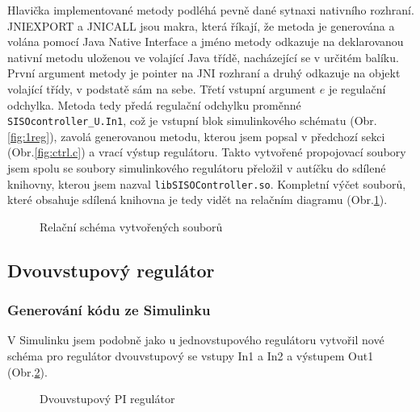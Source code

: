 \documentclass[thesis=M,czech,hidelinks]{FITthesis}[2012/06/26]
\begin{document}
Hlavička implementované metody podléhá pevně dané sytnaxi nativního rozhraní. JNIEXPORT a JNICALL jsou makra, která říkají, že metoda je generována a volána pomocí Java Native Interface a jméno metody odkazuje na deklarovanou nativní metodu uloženou ve volající Java třídě, nacházející se v určitém balíku. První argument metody je pointer na JNI rozhraní a druhý odkazuje na objekt volající třídy, v podstatě sám na sebe.\cite{jnitut} Třetí vstupní argument $e$ je regulační odchylka. Metoda tedy předá regulační odchylku proměnné \texttt{SISOcontroller\_U.In1}, což je vstupní blok simulinkového schématu (Obr.\ref{fig:1reg}), zavolá generovanou metodu, kterou jsem popsal v předchozí sekci (Obr.\ref{fig:ctrl.c}) a vrací
výstup regulátoru. Takto vytvořené propojovací soubory jsem spolu se soubory simulinkového regulátoru přeložil v autíčku do sdílené knihovny, kterou jsem nazval \texttt{libSISOController.so}. Kompletní výčet souborů, které obsahuje sdílená knihovna je tedy vidět na relačním diagramu (Obr.\ref{fig:siso}).
\begin{figure}[h]
        \centering
        \caption{Relační schéma vytvořených souborů}
        \label{fig:siso}
\end{figure} 

\subsection{Dvouvstupový regulátor}
\subsubsection*{Generování kódu ze Simulinku}
V Simulinku jsem podobně jako u jednovstupového regulátoru vytvořil nové schéma pro regulátor dvouvstupový  se vstupy In1 a In2 a výstupem Out1 (Obr.\ref{fig:2reg}). 
\begin{figure}[h]
        \centering
        \caption{Dvouvstupový PI regulátor}
        \label{fig:2reg}
\end{figure}
\end{document}

